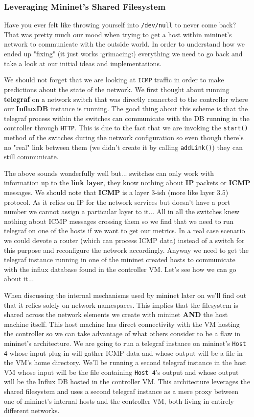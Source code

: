 \documentclass[12pt]{report}
\newcommand{\newpar} {
    \vskip 1cm
}
\begin{document}
\begin{itemize}
			\subsubsection{Leveraging Mininet's Shared Filesystem}
				Have you ever felt like throwing yourself into \texttt{/dev/null} to never come back? That was pretty much our mood when trying to get a host within mininet's network to communicate with the outside world. In order to understand how we ended up "fixing" (it just works :grimacing:) everything we need to go back and take a look at our initial ideas and implementations.
				\newpar
				We should not forget that we are looking at \texttt{ICMP} traffic in order to make predictions about the state of the network. We first thought about running \textbf{telegraf} on a network switch that was directly connected to the controller where our \textbf{InfluxDB} instance is running. The good thing about this scheme is that the telegraf process within the switches can communicate with the DB running in the controller through \texttt{HTTP}. This is due to the fact that we are invoking the \texttt{start()} method of the switches during the network configuration so even though there's no "real" link between them (we didn't create it by calling \texttt{addLink()}) they can still communicate.
				\newpar
				The above sounds wonderfully well but... switches can only work with information up to the \textbf{link layer}, they know nothing about \textbf{IP} packets or \textbf{ICMP} messages. We should note that \textbf{ICMP} is a layer 3-ish (more like layer 3.5) protocol. As it relies on IP for the network services but doesn't have a port number we cannot assign a particular layer to it... All in all the switches knew nothing about ICMP messages crossing them so we find that we need to run telegraf on one of the hosts if we want to get our metrics. In a real case scenario we could devote a router (which can process ICMP data) instead of a switch for this purpose and reconfigure the network accordingly. Anyway we need to get the telegraf instance running in one of the mininet created hosts to communicate with the influx database found in the controller VM. Let's see how we can go about it...
				\newpar
				When discussing the internal mechanisms used by mininet later on we'll find out that it relies solely on network namespaces. This implies that the filesystem is shared across the network elements we create with mininet \textbf{AND} the host machine itself. This host machine has direct connectivity with the VM hosting the controller so we can take advantage of what others consider to be a flaw in mininet's architecture. We are going to run a telegraf instance on mininet's \texttt{Host 4} whose input plug-in will gather ICMP data and whose output will be a file in the VM's home directory. We'll be running a second telegraf instance in the host VM whose input will be the file containing \texttt{Host 4}'s output and whose output will be the Influx DB hosted in the controller VM. This architecture leverages the shared filesystem and uses a second telegraf instance as a mere proxy between one of mininet's internal hosts and the controller VM, both living in entirely different networks.

\end{itemize}
\end{document}
